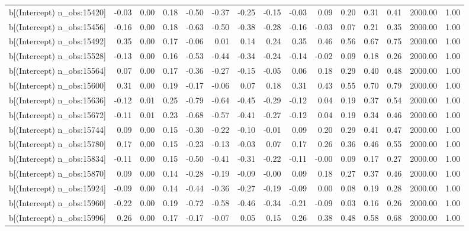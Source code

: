 \begin{table}[ht]
\begin{tabular}{rrrrrrrrrrrrrrr}
  b[(Intercept) n\_obs:15420] & -0.03 & 0.00 & 0.18 & -0.50 & -0.37 & -0.25 & -0.15 & -0.03 & 0.09 & 0.20 & 0.31 & 0.41 & 2000.00 & 1.00 \\ 
  b[(Intercept) n\_obs:15456] & -0.16 & 0.00 & 0.18 & -0.63 & -0.50 & -0.38 & -0.28 & -0.16 & -0.03 & 0.07 & 0.21 & 0.35 & 2000.00 & 1.00 \\ 
  b[(Intercept) n\_obs:15492] & 0.35 & 0.00 & 0.17 & -0.06 & 0.01 & 0.14 & 0.24 & 0.35 & 0.46 & 0.56 & 0.67 & 0.75 & 2000.00 & 1.00 \\ 
  b[(Intercept) n\_obs:15528] & -0.13 & 0.00 & 0.16 & -0.53 & -0.44 & -0.34 & -0.24 & -0.14 & -0.02 & 0.09 & 0.18 & 0.26 & 2000.00 & 1.00 \\ 
  b[(Intercept) n\_obs:15564] & 0.07 & 0.00 & 0.17 & -0.36 & -0.27 & -0.15 & -0.05 & 0.06 & 0.18 & 0.29 & 0.40 & 0.48 & 2000.00 & 1.00 \\ 
  b[(Intercept) n\_obs:15600] & 0.31 & 0.00 & 0.19 & -0.17 & -0.06 & 0.07 & 0.18 & 0.31 & 0.43 & 0.55 & 0.70 & 0.79 & 2000.00 & 1.00 \\ 
  b[(Intercept) n\_obs:15636] & -0.12 & 0.01 & 0.25 & -0.79 & -0.64 & -0.45 & -0.29 & -0.12 & 0.04 & 0.19 & 0.37 & 0.54 & 2000.00 & 1.00 \\ 
  b[(Intercept) n\_obs:15672] & -0.11 & 0.01 & 0.23 & -0.68 & -0.57 & -0.41 & -0.27 & -0.12 & 0.04 & 0.19 & 0.34 & 0.46 & 2000.00 & 1.00 \\ 
  b[(Intercept) n\_obs:15744] & 0.09 & 0.00 & 0.15 & -0.30 & -0.22 & -0.10 & -0.01 & 0.09 & 0.20 & 0.29 & 0.41 & 0.47 & 2000.00 & 1.00 \\ 
  b[(Intercept) n\_obs:15780] & 0.17 & 0.00 & 0.15 & -0.23 & -0.13 & -0.03 & 0.07 & 0.17 & 0.26 & 0.36 & 0.46 & 0.55 & 2000.00 & 1.00 \\ 
  b[(Intercept) n\_obs:15834] & -0.11 & 0.00 & 0.15 & -0.50 & -0.41 & -0.31 & -0.22 & -0.11 & -0.00 & 0.09 & 0.17 & 0.27 & 2000.00 & 1.00 \\ 
  b[(Intercept) n\_obs:15870] & 0.09 & 0.00 & 0.14 & -0.28 & -0.19 & -0.09 & -0.00 & 0.09 & 0.18 & 0.27 & 0.37 & 0.46 & 2000.00 & 1.00 \\ 
  b[(Intercept) n\_obs:15924] & -0.09 & 0.00 & 0.14 & -0.44 & -0.36 & -0.27 & -0.19 & -0.09 & 0.00 & 0.08 & 0.19 & 0.28 & 2000.00 & 1.00 \\ 
  b[(Intercept) n\_obs:15960] & -0.22 & 0.00 & 0.19 & -0.72 & -0.58 & -0.46 & -0.34 & -0.21 & -0.09 & 0.03 & 0.16 & 0.26 & 2000.00 & 1.00 \\ 
  b[(Intercept) n\_obs:15996] & 0.26 & 0.00 & 0.17 & -0.17 & -0.07 & 0.05 & 0.15 & 0.26 & 0.38 & 0.48 & 0.58 & 0.68 & 2000.00 & 1.00 \\ 

\end{tabular}
\end{table}
